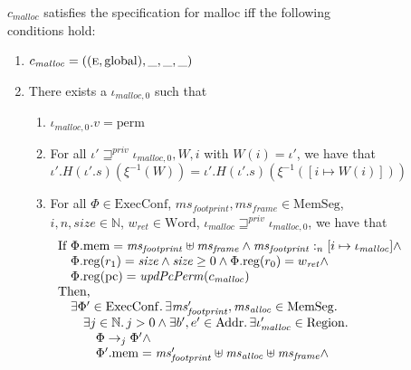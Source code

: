\documentclass[format=acmsmall, review=true, screen=true]{acmart}
\newcommand{\var}[1]{\mathit{#1}}
\newcommand{\hs}{\var{ms}}
\newcommand{\ms}{\hs}
\newcommand{\pcreg}{\mathrm{pc}}
\newcommand{\heap}{\var{mem}}
\newcommand{\hsframe}{\hs_\var{frame}}
\newcommand{\size}{\var{size}}
\newcommand{\plainproj}[1]{\mathrm{#1}}
\newcommand{\memheap}[1][\Phi]{#1.\plainproj{mem}}
\newcommand{\memreg}[1][\Phi]{#1.\plainproj{reg}}
\newcommand{\plainfun}[2]{
  \ifthenelse{\equal{#2}{}}
  {\mathit{#1}}
  {\mathit{#1}(#2)}
}
\newcommand{\updatePcPerm}[1]{\plainfun{updPcPerm}{#1}}
\newcommand{\futurestr}{\mathbin{\sqsupseteq}^{\var{priv}}}
\newcommand{\heapSat}[3][\heap]{#1 :_{#2} #3}
\newcommand{\codelabel}[1]{\mathit{#1}}
\newcommand{\malloc}{\codelabel{malloc}}
\newcommand{\plaindom}[1]{\mathrm{#1}}
\newcommand{\Words}{\plaindom{Word}}
\newcommand{\Addrs}{\plaindom{Addr}}
\newcommand{\ExecConfs}{\plaindom{ExecConf}}
\newcommand{\HeapSegments}{\plaindom{MemSeg}}
\newcommand{\nats}{\mathbb{N}}
\newcommand{\Regions}{\plaindom{Region}}
\newcommand{\plainperm}[1]{\textsc{#1}}
\newcommand{\entry}{\plainperm{e}}
\newcommand{\plainlocality}[1]{\mathrm{#1}}
\newcommand{\glob}{\plainlocality{global}}
\newcommand{\plainview}[1]{\mathrm{#1}}
\newcommand{\perma}{\plainview{perm}}
\newcommand{\step}[1][]{\rightarrow_{#1}}
\newenvironment{toplas}{}{}
\begin{document}
\begin{toplas}
\begin{figure}[htb]
  \centering
  \begin{definition}
    \label{spec:malloc}
    $c_\malloc$ satisfies the specification for malloc iff the following
    conditions hold:
    \begin{enumerate}
    \item \label{item:malloc-spec:eg} $c_\malloc = ((\entry,\glob),\_,\_,\_)$
    \item \label{item:malloc-spec:reg} There exists a $\iota_{\malloc,0}$ such that
      \begin{enumerate}
      \item \label{item:malloc-spec:perm} $\iota_{\malloc,0}.v = \perma$
      \item \label{item:malloc-spec:independent} For all $\iota' \futurestr \iota_{\malloc,0}, W,i$ with
        $W(i)=\iota'$, we have that
        \begin{equation*}
          \iota'.H (\iota'.s) (\xi^{-1}(W)) = \iota'.H (\iota'.s) (\xi^{-1}([i \mapsto W(i)]))
        \end{equation*}
      \item \label{item:malloc-spec:correct-exec} For all $\Phi \in \ExecConfs$, $\ms_{\var{footprint}}, \hsframe \in
        \HeapSegments$, $i, n, \size \in \nats$, $w_{\var{ret}} \in \Words$,
        $\iota_\malloc \futurestr \iota_{\malloc,0}$, we have that
        \[
          \begin{array}{l}
            \text{If }
            \memheap = \ms_{\var{footprint}} \uplus \hsframe \land \heapSat[\ms_{\var{footprint}}]{n}{[i \mapsto \iota_\malloc]} \land \\
            \quad\memreg(r_1) = \size \land \size \geq 0 \land  \memreg(r_0) = w_{\var{ret}} \land \\
            \quad \memreg(\pcreg) = \updatePcPerm{c_\malloc} \\ %
            \text{Then, } \\
            \quad \exists \Phi' \in \ExecConfs \ldotp \exists \ms_{\var{footprint}}', \ms_{\var{alloc}} \in \HeapSegments\ldotp\\
            \qquad \exists j \in \nats \ldotp j > 0 \land \exists b',e'\in \Addrs \ldotp \exists \iota_\malloc' \in \Regions \ldotp \\
            \qquad \quad \Phi \step[j] \Phi' \land \\
            \qquad \quad \memheap[\Phi']=\ms_{\var{footprint}}' \uplus \hs_{\var{alloc}} \uplus \hsframe \land\\

\end{array}\]
\end{enumerate}
\end{enumerate}
\end{definition}
\end{figure}
\end{toplas}
\end{document}
